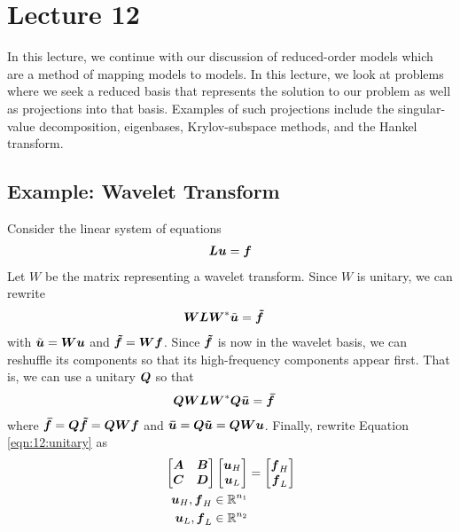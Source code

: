 \chapter{Lecture 12}
In this lecture, we continue with our discussion of reduced-order models which are a method of mapping models to models. In this lecture, we look at problems where we seek a reduced basis that represents the solution to our problem as well as projections into that basis. Examples of such projections include the singular-value decomposition, eigenbases, Krylov-subspace methods, and the Hankel transform.

\section{Example: Wavelet Transform}
Consider the linear system of equations
\begin{align} \label{eqn:12:linear}
\boldsymbol{L} \boldsymbol{u} = \boldsymbol{f}
\end{align}
Let $W$ be the matrix representing a wavelet transform. Since $W$ is unitary, we can rewrite
\begin{align} \label{eqn:12:waveletlinear}
\boldsymbol{W}\boldsymbol{L}\boldsymbol{W}^{*} \tilde{\boldsymbol{u}} &= \boldsymbol{\tilde{f}}
\end{align}
with $\tilde{\boldsymbol{u}} = \boldsymbol{W} \boldsymbol{u}$ and $\boldsymbol{\tilde{f}} = \boldsymbol{W}\boldsymbol{f}$. Since $\boldsymbol{\tilde{f}}$ is now in the wavelet basis, we can reshuffle its components so that its high-frequency components appear first. That is, we can use a unitary $\boldsymbol{Q}$ so that
\begin{align} \label{eqn:12:unitary}
\boldsymbol{Q} \boldsymbol{W} \boldsymbol{L} \boldsymbol{W}^{*} \boldsymbol{Q} \boldsymbol{\bar{u}} &= \boldsymbol{\bar{f}}
\end{align}
where $\boldsymbol{\bar{f}} = \boldsymbol{Q} \boldsymbol{\tilde{f}} = \boldsymbol{Q} \boldsymbol{W} \boldsymbol{f}$ and $\boldsymbol{\bar{u}} = \boldsymbol{Q} \boldsymbol{\tilde{u}} = \boldsymbol{Q} \boldsymbol{W} \boldsymbol{u}$. Finally, rewrite Equation \ref{eqn:12:unitary} as
\begin{align}
\begin{bmatrix}
\boldsymbol{A} & \boldsymbol{B} \\
\boldsymbol{C} & \boldsymbol{D}
\end{bmatrix} \begin{bmatrix}
    \boldsymbol{u}_{H} \\
    \boldsymbol{u}_{L}
\end{bmatrix} &= \begin{bmatrix}
\boldsymbol{f}_{H} \\
\boldsymbol{f}_{L}
\end{bmatrix} \\
\boldsymbol{u}_{H}, \boldsymbol{f}_{H} \in \mathbb{R}^{n_1} \\
\boldsymbol{u}_{L}, \boldsymbol{f}_{L} \in \mathbb{R}^{n_2}
\end{align}
